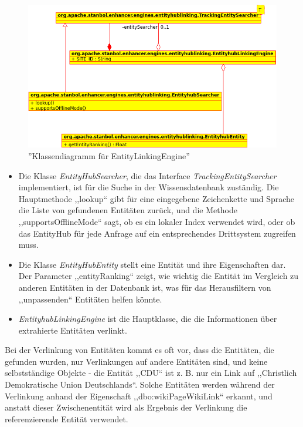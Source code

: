 \begin{figure}[ht]
\centering
\includegraphics[width=\textwidth]{Bilder/classes-linking.png}
\caption{''Klassendiagramm für EntityLinkingEngine''}
\label{fig:linking}
\end{figure}
\begin{itemize}
\item Die Klasse \textit{EntityHubSearcher}, die das Interface \textit{TrackingEntitySearcher} implementiert, ist für die Suche in der Wissensdatenbank zuständig. Die Hauptmethode ,,lookup`` gibt für eine eingegebene Zeichenkette und Sprache die Liste von gefundenen Entitäten zurück, und die Methode ,,supportsOfflineMode`` sagt, ob es ein lokaler Index verwendet wird, oder ob das EntityHub für jede Anfrage auf ein entsprechendes Drittsystem zugreifen muss.
\item Die Klasse \textit{EntityHubEntity} stellt eine Entität und ihre Eigenschaften dar. Der Parameter ,,entityRanking`` zeigt, wie wichtig die Entität im Vergleich zu anderen Entitäten in der Datenbank ist, was für das Herausfiltern von ,,unpassenden`` Entitäten helfen könnte.
\item \textit{EntityhubLinkingEngine} ist die Hauptklasse, die die Informationen über extrahierte Entitäten verlinkt.
\end{itemize}

Bei der Verlinkung von Entitäten kommt es oft vor, dass die Entitäten, die gefunden wurden, nur Verlinkungen auf andere Entitäten sind, und keine selbstständige Objekte - die Entität ,,CDU`` ist z. B. nur ein Link auf ,,Christlich Demokratische Union Deutschlands``. Solche Entitäten werden während der Verlinkung anhand der Eigenschaft ,,dbo:wikiPageWikiLink`` erkannt, und anstatt dieser Zwischenentität wird als Ergebnis der Verlinkung die referenzierende Entität verwendet.

